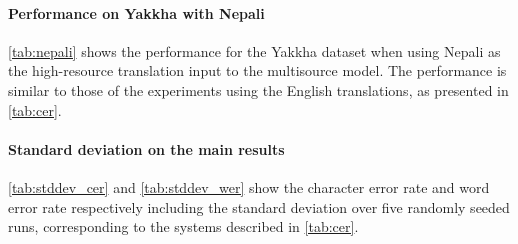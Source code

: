 \paragraph{Performance on Yakkha with Nepali}\autoref{tab:nepali} shows the performance for the Yakkha dataset when using Nepali as the high-resource translation input to the multisource model. The performance is similar to those of the experiments using the English translations, as presented in \autoref{tab:cer}.

\paragraph{Standard deviation on the main results}\autoref{tab:stddev_cer} and \autoref{tab:stddev_wer} show the character error rate and word error rate respectively including the standard deviation over five randomly seeded runs, corresponding to the systems described in \autoref{tab:cer}. 

